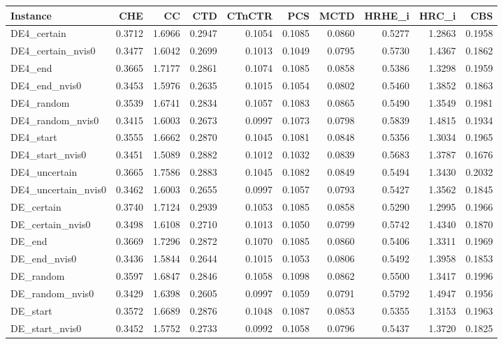 \begin{tabular}{lrrrrrrrrr}
\toprule
Instance & CHE & CC & CTD & CTnCTR & PCS & MCTD & HRHE_i & HRC_i & CBS \\
\midrule
DE4_certain & 0.3712 & 1.6966 & 0.2947 & 0.1054 & 0.1085 & 0.0860 & 0.5277 & 1.2863 & 0.1958 \\
DE4_certain_nvis0 & 0.3477 & 1.6042 & 0.2699 & 0.1013 & 0.1049 & 0.0795 & 0.5730 & 1.4367 & 0.1862 \\
DE4_end & 0.3665 & 1.7177 & 0.2861 & 0.1074 & 0.1085 & 0.0858 & 0.5386 & 1.3298 & 0.1959 \\
DE4_end_nvis0 & 0.3453 & 1.5976 & 0.2635 & 0.1015 & 0.1054 & 0.0802 & 0.5460 & 1.3852 & 0.1863 \\
DE4_random & 0.3539 & 1.6741 & 0.2834 & 0.1057 & 0.1083 & 0.0865 & 0.5490 & 1.3549 & 0.1981 \\
DE4_random_nvis0 & 0.3415 & 1.6003 & 0.2673 & 0.0997 & 0.1073 & 0.0798 & 0.5839 & 1.4815 & 0.1934 \\
DE4_start & 0.3555 & 1.6662 & 0.2870 & 0.1045 & 0.1081 & 0.0848 & 0.5356 & 1.3034 & 0.1965 \\
DE4_start_nvis0 & 0.3451 & 1.5089 & 0.2882 & 0.1012 & 0.1032 & 0.0839 & 0.5683 & 1.3787 & 0.1676 \\
DE4_uncertain & 0.3665 & 1.7586 & 0.2883 & 0.1045 & 0.1082 & 0.0849 & 0.5494 & 1.3430 & 0.2032 \\
DE4_uncertain_nvis0 & 0.3462 & 1.6003 & 0.2655 & 0.0997 & 0.1057 & 0.0793 & 0.5427 & 1.3562 & 0.1845 \\
DE_certain & 0.3740 & 1.7124 & 0.2939 & 0.1053 & 0.1085 & 0.0858 & 0.5290 & 1.2995 & 0.1966 \\
DE_certain_nvis0 & 0.3498 & 1.6108 & 0.2710 & 0.1013 & 0.1050 & 0.0799 & 0.5742 & 1.4340 & 0.1870 \\
DE_end & 0.3669 & 1.7296 & 0.2872 & 0.1070 & 0.1085 & 0.0860 & 0.5406 & 1.3311 & 0.1969 \\
DE_end_nvis0 & 0.3436 & 1.5844 & 0.2644 & 0.1015 & 0.1053 & 0.0806 & 0.5492 & 1.3958 & 0.1853 \\
DE_random & 0.3597 & 1.6847 & 0.2846 & 0.1058 & 0.1098 & 0.0862 & 0.5500 & 1.3417 & 0.1996 \\
DE_random_nvis0 & 0.3429 & 1.6398 & 0.2605 & 0.0997 & 0.1059 & 0.0791 & 0.5792 & 1.4947 & 0.1956 \\
DE_start & 0.3572 & 1.6689 & 0.2876 & 0.1048 & 0.1087 & 0.0853 & 0.5355 & 1.3153 & 0.1963 \\
DE_start_nvis0 & 0.3452 & 1.5752 & 0.2733 & 0.0992 & 0.1058 & 0.0796 & 0.5437 & 1.3720 & 0.1825 \\

\end{tabular}

